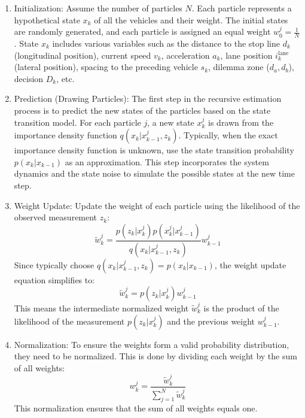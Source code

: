 \begin{enumerate}
    \item Initialization: Assume the number of particles \( N \). Each particle represents a hypothetical state \( x_k \) of all the vehicles and their weight. The initial states are randomly generated, and each particle is assigned an equal weight \( w_0^{j} = \frac{1}{N} \). State $x_k$ includes various variables such as the distance to the stop line $d_k$ (longitudinal position), current speed $v_k$, acceleration $a_k$, lane position $i_k^{\text{lane}}$ (lateral position), spacing to the preceding vehicle $s_k$, dilemma zone ($d_a, d_b$), decision $D_{k}$, etc. 
    \item Prediction (Drawing Particles): The first step in the recursive estimation process is to predict the new states of the particles based on the state transition model. For each particle \(j\), a new state \(x_k^{j}\) is drawn from the importance density function \(q(x_k | x_{k-1}^{j}, z_k)\). Typically, when the exact importance density function is unknown, use the state transition probability \(p(x_k | x_{k-1})\) as an approximation. This step incorporates the system dynamics and the state noise to simulate the possible states at the new time step.
    \item Weight Update: Update the weight of each particle using the likelihood of the observed measurement \( z_k \):
      \begin{equation}
          \tilde w_k^{j} = \frac{p(z_k | x_k^{j}) p(x_k^{j} | x_{k-1}^{j})}{q(x_k | x_{k-1}^{j}, z_k)} w_{k-1}^{j}
      \end{equation}
      Since typically choose \(q(x_k | x_{k-1}^{j}, z_k) = p(x_k | x_{k-1})\), the weight update equation simplifies to:
      \begin{equation}
          \tilde w_k^{j} = p(z_k | x_k^{j}) w_{k-1}^{j}
      \end{equation}
      This means the intermediate normalized weight \(\tilde w_k^{j}\) is the product of the likelihood of the measurement \(p(z_k | x_k^{j})\) and the previous weight \(w_{k-1}^{j}\).
    \item Normalization: To ensure the weights form a valid probability distribution, they need to be normalized. This is done by dividing each weight by the sum of all weights:
      \begin{equation}
          {w}_k^{j} = \frac{\tilde w_k^{j}}{\sum_{j=1}^N \tilde w_k^{j}}
      \end{equation}
      This normalization ensures that the sum of all weights equals one.

\end{enumerate}
